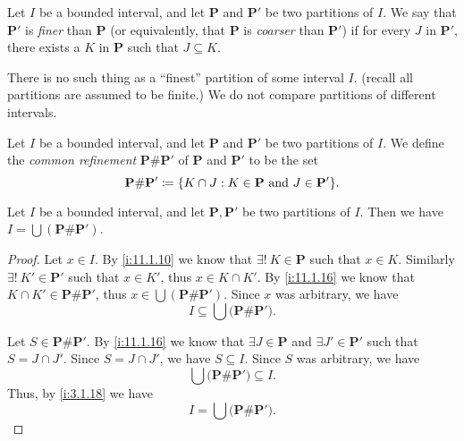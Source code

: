 \begin{defn}\label{i:11.1.14}
  Let \(I\) be a bounded interval, and let \(\mathbf{P}\) and \(\mathbf{P}'\) be two partitions of \(I\).
  We say that \(\mathbf{P}'\) is \emph{finer} than \(\mathbf{P}\) (or equivalently, that \(\mathbf{P}\) is \emph{coarser} than \(\mathbf{P}'\)) if for every \(J\) in \(\mathbf{P}'\), there exists a \(K\) in \(\mathbf{P}\) such that \(J \subseteq K\).
\end{defn}

\begin{note}
  There is no such thing as a ``finest'' partition of some interval \(I\).
  (recall all partitions are assumed to be finite.)
  We do not compare partitions of different intervals.
\end{note}

\setcounter{thm}{15}
\begin{defn}\label{i:11.1.16}
  Let \(I\) be a bounded interval, and let \(\mathbf{P}\) and \(\mathbf{P}'\) be two partitions of \(I\).
  We define the \emph{common refinement} \(\mathbf{P} \# \mathbf{P}'\) of \(\mathbf{P}\) and \(\mathbf{P}'\) to be the set
  \[
    \mathbf{P} \# \mathbf{P}' \coloneqq \set{K \cap J : K \in \mathbf{P} \text{ and } J \in \mathbf{P}'}.
  \]
\end{defn}

\begin{ac}\label{i:ac:11.1.1}
  Let \(I\) be a bounded interval, and let \(\mathbf{P}, \mathbf{P}'\) be two partitions of \(I\).
  Then we have \(I = \bigcup (\mathbf{P} \# \mathbf{P}')\).
\end{ac}

\begin{proof}
  Let \(x \in I\).
  By \cref{i:11.1.10} we know that \(\exists!\ K \in \mathbf{P}\) such that \(x \in K\).
  Similarly \(\exists!\ K' \in \mathbf{P}'\) such that \(x \in K'\), thus \(x \in K \cap K'\).
  By \cref{i:11.1.16} we know that \(K \cap K' \in \mathbf{P} \# \mathbf{P}'\), thus \(x \in \bigcup (\mathbf{P} \# \mathbf{P}')\).
  Since \(x\) was arbitrary, we have
  \[
    I \subseteq \bigcup \big(\mathbf{P} \# \mathbf{P}'\big).
  \]

  Let \(S \in \mathbf{P} \# \mathbf{P}'\).
  By \cref{i:11.1.16} we know that \(\exists J \in \mathbf{P}\) and \(\exists J' \in \mathbf{P}'\) such that \(S = J \cap J'\).
  Since \(S = J \cap J'\), we have \(S \subseteq I\).
  Since \(S\) was arbitrary, we have
  \[
    \bigcup \big(\mathbf{P} \# \mathbf{P}'\big) \subseteq I.
  \]
  Thus, by \cref{i:3.1.18} we have
  \[
    I = \bigcup \big(\mathbf{P} \# \mathbf{P}'\big).
  \]
\end{proof}


